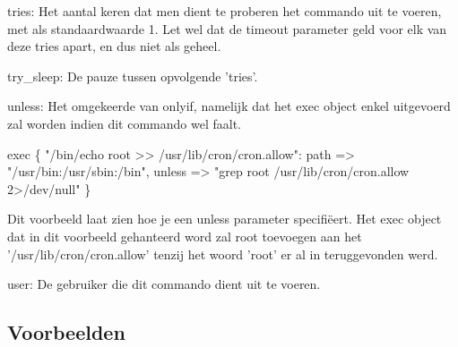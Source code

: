 		tries:
		Het aantal keren dat men dient te proberen het commando uit te voeren, met als standaardwaarde 1.
		Let wel dat de timeout parameter geld voor elk van deze tries apart, en dus niet als geheel.

		try\_sleep:
		De pauze tussen opvolgende 'tries'.

		unless:
		Het omgekeerde van onlyif, namelijk dat het exec object enkel uitgevoerd zal worden indien dit commando wel faalt.

			exec \{ "/bin/echo root >> /usr/lib/cron/cron.allow":
				path => "/usr/bin:/usr/sbin:/bin",
				unless => "grep root /usr/lib/cron/cron.allow 2>/dev/null"
			\}

		Dit voorbeeld laat zien hoe je een unless parameter specifi\"{e}ert.
		Het exec object dat in dit voorbeeld gehanteerd word zal root toevoegen aan het '/usr/lib/cron/cron.allow' tenzij het woord 'root' er al in teruggevonden werd.

		user:
		De gebruiker die dit commando dient uit te voeren.

\subsection{Voorbeelden}
